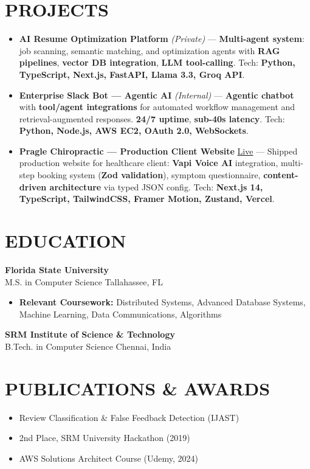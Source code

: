 \documentclass[letterpaper,10pt]{article}
\newcommand{\resumeItem}[1]{\item\small #1}
\newcommand{\resumeSubheading}[4]{
  \vspace{4pt}
  \noindent
  \textbf{#1} \hfill {\footnotesize #2} \\
  [-1pt]
  \noindent
  \small #3 \hfill {\small #4}
  \vspace{2pt}
}
\newcommand{\resumeItemsStart}{\vspace{-2pt}\begin{itemize}}
\newcommand{\resumeItemsEnd}{\end{itemize}\vspace{4pt}}
\begin{document}
\section{\textcolor{metablue}{PROJECTS}}
\vspace{-5pt}
\begin{tcolorbox}[colback=white,colframe=metablue,boxrule=0.8pt,arc=2pt,left=4pt,right=4pt,top=2pt,bottom=2pt]
\begin{itemize}
\resumeItem{\textbf{AI Resume Optimization Platform} \textit{(Private)} --- \textbf{Multi-agent system}: job scanning, semantic matching, and optimization agents with \textbf{RAG pipelines}, \textbf{vector DB integration}, \textbf{LLM tool-calling}. Tech: \textbf{Python, TypeScript, Next.js, FastAPI, Llama 3.3, Groq API}.}
\resumeItem{\textbf{Enterprise Slack Bot --- Agentic AI} \textit{(Internal)} --- \textbf{Agentic chatbot} with \textbf{tool/agent integrations} for automated workflow management and retrieval-augmented responses. \textbf{24/7 uptime}, \textbf{sub-40s latency}. Tech: \textbf{Python, Node.js, AWS EC2, OAuth 2.0, WebSockets}.}
\resumeItem{\textbf{Pragle Chiropractic --- Production Client Website} \href{https://www.praglechiropractictallahassee.com/}{Live} --- Shipped production website for healthcare client: \textbf{Vapi Voice AI} integration, multi-step booking system (\textbf{Zod validation}), symptom questionnaire, \textbf{content-driven architecture} via typed JSON config. Tech: \textbf{Next.js 14, TypeScript, TailwindCSS, Framer Motion, Zustand, Vercel}.}
\end{itemize}
\end{tcolorbox}
\vspace{-5pt}


\section{\textcolor{metablue}{EDUCATION}}
\vspace{-10pt}
\resumeSubheading
{Florida State University}{}
{M.S. in Computer Science}{Tallahassee, FL}
\resumeItemsStart
\resumeItem{\textbf{Relevant Coursework:} Distributed Systems, Advanced Database Systems, Machine Learning, Data Communications, Algorithms}
\resumeItemsEnd
\vspace{-5pt}
\resumeSubheading
{SRM Institute of Science \& Technology}{}
{B.Tech. in Computer Science}{Chennai, India}
\vspace{-10pt}

\section{\textcolor{metablue}{PUBLICATIONS \& AWARDS}}
\vspace{-5pt}
\begin{itemize}
\resumeItem{Review Classification \& False Feedback Detection (IJAST)}
\resumeItem{2nd Place, SRM University Hackathon (2019)}
\resumeItem{AWS Solutions Architect Course (Udemy, 2024)}
\end{itemize}
\end{document}
